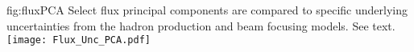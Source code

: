 \begin{dunefigure}{fig:fluxPCA}
{Select flux principal components are compared to specific underlying uncertainties from the hadron production and beam focusing models. See text. }
    \texttt{[image: Flux\_Unc\_PCA.pdf]}
\end{dunefigure}





